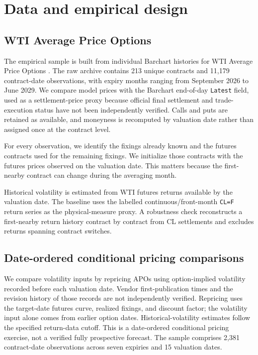 \section{Data and empirical design}\label{sec:short_design}

\subsection{WTI Average Price Options}

The empirical sample is built from individual Barchart histories for WTI Average Price Options \citep{barchartwti2026}. The raw archive contains 213 unique contracts and 11,179 contract-date observations, with expiry months ranging from September 2026 to June 2029. We compare model prices with the Barchart end-of-day \texttt{Latest} field, used as a settlement-price proxy because official final settlement and trade-execution status have not been independently verified. Calls and puts are retained as available, and moneyness is recomputed by valuation date rather than assigned once at the contract level.

For every observation, we identify the fixings already known and the futures contracts used for the remaining fixings. We initialize those contracts with the futures prices observed on the valuation date. This matters because the first-nearby contract can change during the averaging month.

Historical volatility is estimated from WTI futures returns available by the valuation date. The baseline uses the labelled continuous/front-month \texttt{CL=F} return series as the physical-measure proxy. A robustness check reconstructs a first-nearby return history contract by contract from CL settlements and excludes returns spanning contract switches.

\subsection{Date-ordered conditional pricing comparisons}

We compare volatility inputs by repricing APOs using option-implied volatility recorded before each valuation date. Vendor first-publication times and the revision history of those records are not independently verified. Repricing uses the target-date futures curve, realized fixings, and discount factor; the volatility input alone comes from earlier option dates. Historical-volatility estimates follow the specified return-data cutoff. This is a date-ordered conditional pricing exercise, not a verified fully prospective forecast. The sample comprises 2,381 contract-date observations across seven expiries and 15 valuation dates.

